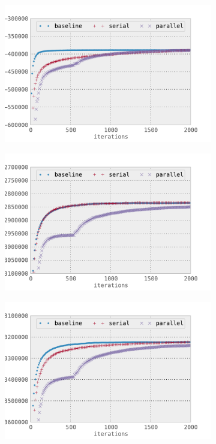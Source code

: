 \begin{figure}[h]
    \center
    \begin{subfigure}{0.48\textwidth}
        \includegraphics[width=\textwidth]{fig/base_ll}
        \label{fig:ll_base}
    \end{subfigure}
    \begin{subfigure}{0.48\textwidth}
        \includegraphics[width=\textwidth]{fig/crp_ll}
        \label{fig:ll_crp}
    \end{subfigure}
    \begin{subfigure}{0.48\textwidth}
        \includegraphics[width=\textwidth]{fig/full_ll}

\end{subfigure}
\end{figure}
